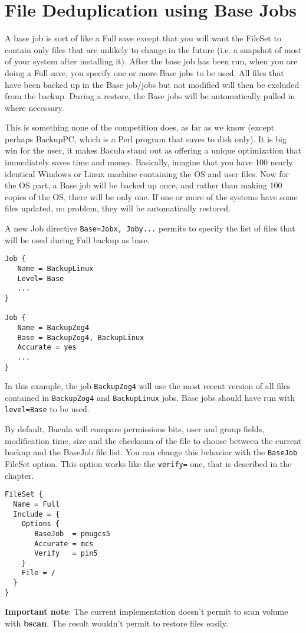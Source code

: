 \chapter{File Deduplication using Base Jobs}
\label{basejobs}
A base job is sort of like a Full save except that you will want the FileSet to
contain only files that are unlikely to change in the future (i.e.  a snapshot
of most of your system after installing it).  After the base job has been run,
when you are doing a Full save, you specify one or more Base jobs to be used.
All files that have been backed up in the Base job/jobs but not modified will
then be excluded from the backup.  During a restore, the Base jobs will be
automatically pulled in where necessary.

This is something none of the competition does, as far as we know (except
perhaps BackupPC, which is a Perl program that saves to disk only).  It is big
win for the user, it makes Bacula stand out as offering a unique optimization
that immediately saves time and money.  Basically, imagine that you have 100
nearly identical Windows or Linux machine containing the OS and user files.
Now for the OS part, a Base job will be backed up once, and rather than making
100 copies of the OS, there will be only one.  If one or more of the systems
have some files updated, no problem, they will be automatically restored.

A new Job directive \texttt{Base=Jobx, Joby...} permits to specify the list of
files that will be used during Full backup as base.

\begin{verbatim}
Job {
   Name = BackupLinux
   Level= Base
   ...
}

Job {
   Name = BackupZog4
   Base = BackupZog4, BackupLinux
   Accurate = yes
   ...
}
\end{verbatim}

In this example, the job \texttt{BackupZog4} will use the most recent version
of all files contained in \texttt{BackupZog4} and \texttt{BackupLinux}
jobs. Base jobs should have run with \texttt{level=Base} to be used.

By default, Bacula will compare permissions bits, user and group fields,
modification time, size and the checksum of the file to choose between the
current backup and the BaseJob file list. You can change this behavior with the
\texttt{BaseJob} FileSet option. This option works like the \texttt{verify=}
one, that is described in the  chapter.

\begin{verbatim}
FileSet {
  Name = Full
  Include = {
    Options {
       BaseJob  = pmugcs5
       Accurate = mcs
       Verify   = pin5
    }
    File = /
  }
}
\end{verbatim}

\textbf{Important note}: The current implementation doesn't permit to scan
volume with \textbf{bscan}. The result wouldn't permit to restore files easily.